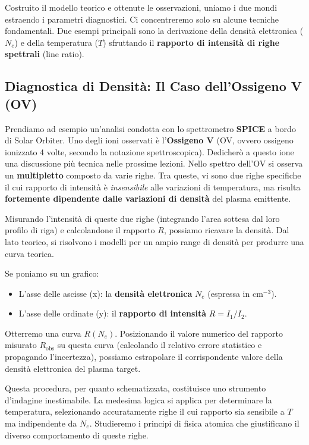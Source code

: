 Costruito il modello teorico e ottenute le osservazioni, uniamo i due mondi estraendo i parametri diagnostici. Ci concentreremo solo su alcune tecniche fondamentali. Due esempi principali sono la derivazione della densità elettronica ($N_e$) e della temperatura ($T$) sfruttando il \textbf{rapporto di intensità di righe spettrali} (line ratio).

    \subsection{Diagnostica di Densità: Il Caso dell'Ossigeno V (OV)}
    
    Prendiamo ad esempio un'analisi condotta con lo spettrometro \textbf{SPICE} a bordo di Solar Orbiter. Uno degli ioni osservati è l'\textbf{Ossigeno V} (OV, ovvero ossigeno ionizzato 4 volte, secondo la notazione spettroscopica). Dedicherò a questo ione una discussione più tecnica nelle prossime lezioni.
    Nello spettro dell'OV si osserva un \textbf{multipletto} composto da varie righe. Tra queste, vi sono due righe specifiche il cui rapporto di intensità è \textit{insensibile} alle variazioni di temperatura, ma risulta \textbf{fortemente dipendente dalle variazioni di densità} del plasma emittente.
    
    Misurando l'intensità di queste due righe (integrando l'area sottesa dal loro profilo di riga) e calcolandone il rapporto $R$, possiamo ricavare la densità.
    Dal lato teorico, si risolvono i modelli per un ampio range di densità per produrre una curva teorica.
    
    Se poniamo su un grafico:
    \begin{itemize}
        \item L'asse delle ascisse (x): la \textbf{densità elettronica} $N_e$ (espressa in $\text{cm}^{-3}$).
        \item L'asse delle ordinate (y): il \textbf{rapporto di intensità} $R = I_1 / I_2$.
    \end{itemize}
    Otterremo una curva $R(N_e)$. Posizionando il valore numerico del rapporto misurato $R_{\text{obs}}$ su questa curva (calcolando il relativo errore statistico e propagando l'incertezza), possiamo estrapolare il corrispondente valore della densità elettronica del plasma target.
    
    Questa procedura, per quanto schematizzata, costituisce uno strumento d'indagine inestimabile. La medesima logica si applica per determinare la temperatura, selezionando accuratamente righe il cui rapporto sia sensibile a $T$ ma indipendente da $N_e$. Studieremo i principi di fisica atomica che giustificano il diverso comportamento di queste righe.
    
